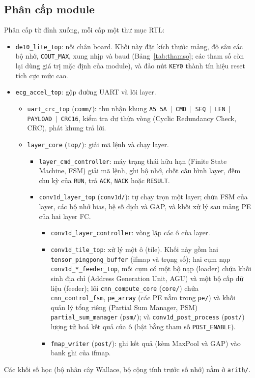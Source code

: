 \subsection{Phân cấp module}
Phân cấp từ đỉnh xuống, mỗi cấp một thư mục RTL:
\begin{itemize}
  \item \texttt{de10\_lite\_top}: nối chân board.
  Khối này đặt kích thước mảng, độ sâu các bộ nhớ, \texttt{COUT\_MAX}, xung nhịp và baud (Bảng~\ref{tab:thamso}; các tham số còn lại dùng giá trị mặc định của module), và đảo nút \texttt{KEY0} thành tín hiệu reset tích cực mức cao.
  \item \texttt{ecg\_accel\_top}: gộp đường UART và lõi layer.
  \begin{itemize}
    \item \texttt{uart\_crc\_top} (\texttt{comm/}): thu nhận khung \texttt{A5 5A $|$ CMD $|$ SEQ $|$ LEN $|$ PAYLOAD $|$ CRC16}, kiểm tra dư thừa vòng (Cyclic Redundancy Check, CRC), phát khung trả lời.
    \item \texttt{layer\_core} (\texttt{top/}): giải mã lệnh và chạy layer.
    \begin{itemize}
      \item \texttt{layer\_cmd\_controller}: máy trạng thái hữu hạn (Finite State Machine, FSM) giải mã lệnh, ghi bộ nhớ, chốt cấu hình layer, đếm chu kỳ của \texttt{RUN}, trả \texttt{ACK}, \texttt{NACK} hoặc \texttt{RESULT}.
      \item \texttt{conv1d\_layer\_top} (\texttt{conv1d/}): tự chạy trọn một layer; chứa FSM của layer, các bộ nhớ bias, hệ số dịch và GAP, và khối xử lý sau mảng PE của hai layer FC.
      \begin{itemize}
        \item \texttt{conv1d\_layer\_controller}: vòng lặp các ô của layer.
        \item \texttt{conv1d\_tile\_top}: xử lý một ô (tile).
        Khối này gồm hai \texttt{tensor\_pingpong\_buffer} (ifmap và trọng số); hai cụm nạp \texttt{conv1d\_*\_feeder\_top}, mỗi cụm có một bộ nạp (loader) chứa khối sinh địa chỉ (Address Generation Unit, AGU) và một bộ cấp dữ liệu (feeder); lõi \texttt{cnn\_compute\_core} (\texttt{core/}) chứa \texttt{cnn\_control\_fsm}, \texttt{pe\_array} (các PE nằm trong \texttt{pe/}) và khối quản lý tổng riêng (Partial Sum Manager, PSM) \texttt{partial\_sum\_manager} (\texttt{psm/}); và \texttt{conv1d\_post\_process} (\texttt{post/}) lượng tử hoá kết quả của ô (bật bằng tham số \texttt{POST\_ENABLE}).
        \item \texttt{fmap\_writer} (\texttt{post/}): ghi kết quả (kèm MaxPool và GAP) vào bank ghi của ifmap.
      \end{itemize}
    \end{itemize}
  \end{itemize}
\end{itemize}
Các khối số học (bộ nhân cây Wallace, bộ cộng tính trước số nhớ) nằm ở \texttt{arith/}.


